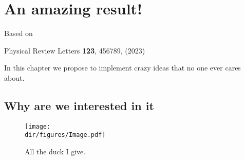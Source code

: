\chapter{An amazing result!}
\label{ch:chapter-3}

\centerline{Based on}
\centerline{Physical Review Letters \textbf{123}, 456789, (2023) \cite{Name:2023}}
\vspace{1em}

In this chapter we propose to implement crazy ideas that no one ever cares about. 

\section{Why are we interested in it}

\lipsum[1-6]

\begin{figure}[t]
	\centering
	\texttt{[image: \\dir/figures/Image.pdf]}
	\caption{All the duck I give.}
	\label{fig:Duck3}
\end{figure}